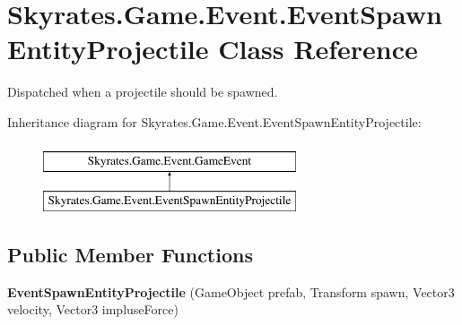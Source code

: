 \hypertarget{class_skyrates_1_1_game_1_1_event_1_1_event_spawn_entity_projectile}{\section{Skyrates.\-Game.\-Event.\-Event\-Spawn\-Entity\-Projectile Class Reference}
\label{class_skyrates_1_1_game_1_1_event_1_1_event_spawn_entity_projectile}
}


Dispatched when a projectile should be spawned.  


Inheritance diagram for Skyrates.\-Game.\-Event.\-Event\-Spawn\-Entity\-Projectile\-:\begin{figure}[H]
\begin{center}
\leavevmode
\includegraphics[height=2.000000cm]{class_skyrates_1_1_game_1_1_event_1_1_event_spawn_entity_projectile}
\end{center}
\end{figure}
\subsection*{Public Member Functions}
\begin{DoxyCompactItemize}
\item 
\hypertarget{class_skyrates_1_1_game_1_1_event_1_1_event_spawn_entity_projectile_ace2782adeefdb54f24d5ad0f9c916376}{{\bfseries Event\-Spawn\-Entity\-Projectile} (Game\-Object prefab, Transform spawn, Vector3 velocity, Vector3 impluse\-Force)}\label{class_skyrates_1_1_game_1_1_event_1_1_event_spawn_entity_projectile_ace2782adeefdb54f24d5ad0f9c916376}

\end{DoxyCompactItemize}
